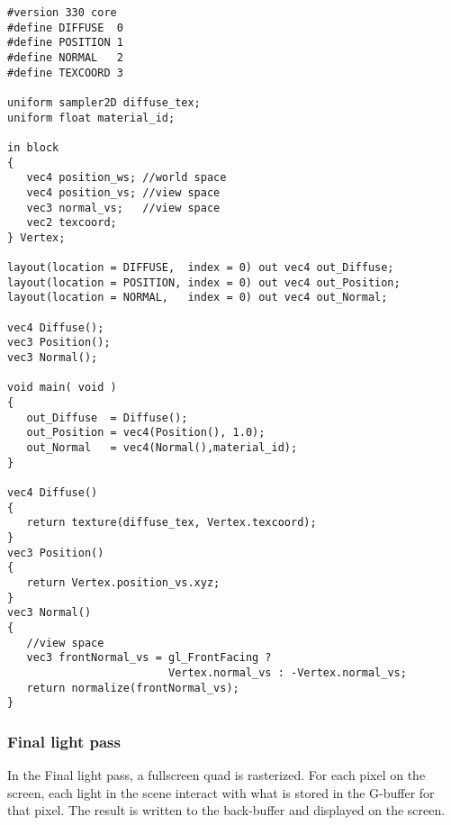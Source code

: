 \begin{lstlisting}
#version 330 core
#define DIFFUSE  0
#define POSITION 1
#define NORMAL   2
#define TEXCOORD 3

uniform sampler2D diffuse_tex;
uniform float material_id;

in block
{
   vec4 position_ws; //world space
   vec4 position_vs; //view space
   vec3 normal_vs;   //view space
   vec2 texcoord;
} Vertex;

layout(location = DIFFUSE,  index = 0) out vec4 out_Diffuse;
layout(location = POSITION, index = 0) out vec4 out_Position;
layout(location = NORMAL,   index = 0) out vec4 out_Normal;

vec4 Diffuse();
vec3 Position();
vec3 Normal();

void main( void )
{
   out_Diffuse  = Diffuse();
   out_Position = vec4(Position(), 1.0);
   out_Normal   = vec4(Normal(),material_id);
}

vec4 Diffuse()
{
   return texture(diffuse_tex, Vertex.texcoord);
}
vec3 Position()
{
   return Vertex.position_vs.xyz;
}
vec3 Normal()
{
   //view space
   vec3 frontNormal_vs = gl_FrontFacing ? 
                         Vertex.normal_vs : -Vertex.normal_vs;
   return normalize(frontNormal_vs);
}
\end{lstlisting}

\subsubsection{Final light pass}
In the Final light pass, a fullscreen quad is rasterized. For each pixel on the screen, each light in the scene interact with what is stored in the G-buffer for that pixel. The result is written to the back-buffer and displayed on the screen.

